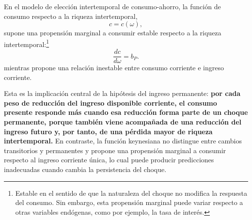 \documentclass[11pt]{article}
\begin{document}
En el modelo de elección intertemporal de consumo-ahorro, la función de consumo respecto a la riqueza intertemporal,
\[
  c=c(\omega),
\]
supone una propensión marginal a consumir estable respecto a la riqueza intertemporal:\footnote{Estable en el sentido de que la naturaleza del choque no modifica la respuesta del consumo. Sin embargo, esta propensión marginal puede variar respecto a otras variables endógenas, como por ejemplo, la tasa de interés.}
\[
  \frac{dc}{d\omega} = b_P.
\]
mientras propone una relación inestable entre consumo corriente e ingreso corriente.

Esta es la implicación central de la hipótesis del ingreso permanente: \textbf{por cada peso de reducción del ingreso disponible corriente, el consumo presente responde más cuando esa reducción forma parte de un choque permanente, porque también viene acompañada de una reducción del ingreso futuro y, por tanto, de una pérdida mayor de riqueza intertemporal.} En contraste, la función keynesiana no distingue entre cambios transitorios y permanentes y propone una propensión marginal a consumir respecto al ingreso corriente única, lo cual puede producir predicciones inadecuadas cuando cambia la persistencia del choque.
\end{document}
